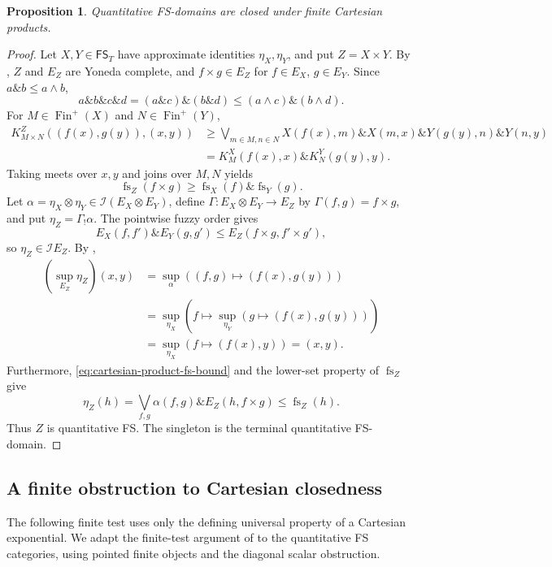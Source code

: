 \documentclass[preprint,3p,times]{elsarticle}
\newtheorem{proposition}[proposition]{Proposition}
\theoremstyle{definition}
\theoremstyle{remark}
\newcommand{\I}{\mathcal{I}}
\newcommand{\FS}{\mathsf{FS}}
\newcommand{\supop}{\operatorname{sup}}
\newcommand{\fs}{\operatorname{fs}}
\newcommand{\Finp}{\operatorname{Fin}^{+}}
\newcommand{\tn}{\mathbin{\&}}
\numberwithin{equation}{section}
\begin{document}
\begin{proposition}\label{prop:cartesian-products}
Quantitative FS-domains are closed under finite Cartesian products.
\end{proposition}

\begin{proof}
Let \(X,Y\in\FS_T\) have approximate identities \(\eta_X,\eta_Y\), and put \(Z=X\times Y\). By , \(Z\) and \(E_Z\) are Yoneda complete, and \(f\times g\in E_Z\) for \(f\in E_X\), \(g\in E_Y\). Since \(a\tn b\leq a\wedge b\),
\[
 a\tn b\tn c\tn d=(a\tn c)\tn(b\tn d)\leq(a\wedge c)\tn(b\wedge d).
\]
For \(M\in\Finp(X)\) and \(N\in\Finp(Y)\),
\begin{align*}
 K^Z_{M\times N}((f(x),g(y)),(x,y))
 &\geq\bigvee_{m\in M,n\in N}
 X(f(x),m)\tn X(m,x)\tn Y(g(y),n)\tn Y(n,y)\\
 &=K^X_M(f(x),x)\tn K^Y_N(g(y),y).
\end{align*}
Taking meets over \(x,y\) and joins over \(M,N\) yields
\begin{equation}\label{eq:cartesian-product-fs-bound}
 \fs_Z(f\times g)\geq\fs_X(f)\tn\fs_Y(g).
\end{equation}
Let \(\alpha=\eta_X\otimes\eta_Y\in\I(E_X\otimes E_Y)\), define \(\Gamma\colon E_X\otimes E_Y\to E_Z\) by \(\Gamma(f,g)=f\times g\), and put \(\eta_Z=\Gamma_!\alpha\). The pointwise fuzzy order gives
\[
 E_X(f,f')\tn E_Y(g,g')
 \leq E_Z(f\times g,f'\times g'),
\]
so \(\eta_Z\in\I E_Z\). By ,
\begin{align*}
 (\supop_{E_Z}\eta_Z)(x,y)
 &=\supop_\alpha((f,g)\mapsto(f(x),g(y)))\\
 &=\supop_{\eta_X}\left(f\mapsto\supop_{\eta_Y}(g\mapsto(f(x),g(y)))\right)\\
 &=\supop_{\eta_X}(f\mapsto(f(x),y))=(x,y).
\end{align*}
Furthermore, \eqref{eq:cartesian-product-fs-bound} and the lower-set property of \(\fs_Z\) give
\[
 \eta_Z(h)
 =\bigvee_{f,g}\alpha(f,g)\tn E_Z(h,f\times g)
 \leq\fs_Z(h).
\]
Thus \(Z\) is quantitative FS. The singleton is the terminal quantitative FS-domain.
\end{proof}

\subsection{A finite obstruction to Cartesian closedness}
The following finite test uses only the defining universal property of a Cartesian exponential. We adapt the finite-test argument of \cite[Section~3]{LaiLuo2026} to the quantitative FS categories, using pointed finite objects and the diagonal scalar obstruction.
\end{document}
